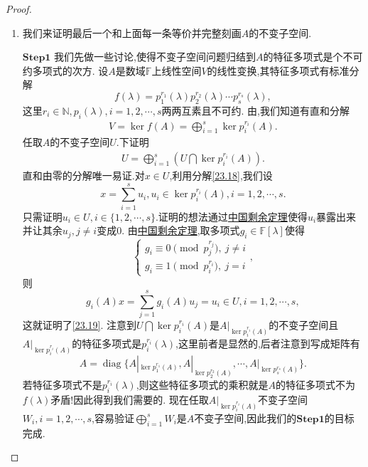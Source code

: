 \documentclass[../../main.tex]{subfiles}%
\begin{document}
\begin{proof}
\begin{enumerate}[(1)]
\item 我们来证明最后一个和上面每一条等价并完整刻画$A$的不变子空间.

$\mathbf{Step}\mathbf{1}$ 我们先做一些讨论,使得不变子空间问题归结到$A$的特征多项式是个不可约多项式的次方.
设$A$是数域$\mathbb{F}$上线性空间$V$的线性变换,其特征多项式有标准分解
$$f(\lambda)=p_1^{r_1}(\lambda)p_2^{r_2}(\lambda)\cdots p_s^{r_s}(\lambda),$$
这里$r_i\in\mathbb{N},p_i(\lambda),i=1,2,\cdots,s$两两互素且不可约.
由,我们知道有直和分解
\begin{align}
V=\ker f(A)=\bigoplus_{i=1}^s\ker p_i^{r_i}(A)\label{23.18}.
\end{align}
任取$A$的不变子空间$U$.下证明
\begin{align}
U=\bigoplus_{i=1}^s\left(U\bigcap\ker p_i^{r_i}(A)\right)\label{23.19}.
\end{align}
直和由零的分解唯一易证.对$x\in U$,利用分解\eqref{23.18},我们设
$$x=\sum_{i=1}^su_i,u_i\in\ker p_i^{r_i}(A),i=1,2,\cdots,s.$$
只需证明$u_i\in U,i\in\{1,2,\cdots,s\}$.证明的想法通过\hyperref[theorem:中国剩余定理(多项式版)]{中国剩余定理}使得$u_i$暴露出来并让其余$u_j,j\neq i$变成$0$.
由\hyperref[theorem:中国剩余定理(多项式版)]{中国剩余定理},取多项式$g_i\in\mathbb{F}[\lambda]$使得
$$\begin{cases}g_i\equiv0\pmod{p_j^{r_j}},\ j\neq i\\g_i\equiv1\pmod{p_i^{r_i}},\ j=i\end{cases},$$
则
$$g_i(A)x=\sum_{j=1}^sg_i(A)u_j=u_i\in U,i=1,2,\cdots,s,$$
这就证明了\eqref{23.19}.
注意到$U\bigcap\ker p_i^{r_i}(A)$是$A|_{\ker p_i^{r_i}(A)}$的不变子空间且$A|_{\ker p_i^{r_i}(A)}$的特征多项式是$p_i^{r_i}(\lambda)$,这里前者是显然的,后者注意到写成矩阵有
$$A=\operatorname{diag}\{A|_{\ker p_1^{r_1}(A)},A|_{\ker p_2^{r_2}(A)},\cdots,A|_{\ker p_s^{r_s}(A)}\}.$$
若特征多项式不是$p_i^{r_i}(\lambda)$,则这些特征多项式的乘积就是$A$的特征多项式不为$f(\lambda)$矛盾!因此得到我们需要的.
现在任取$A|_{\ker p_i^{r_i}(A)}$不变子空间$W_i,i=1,2,\cdots,s$,容易验证$\bigoplus_{i=1}^sW_i$是$A$不变子空间,因此我们的$\mathbf{Step}\mathbf{1}$的目标完成.


\end{enumerate}
\end{proof}
\end{document}
